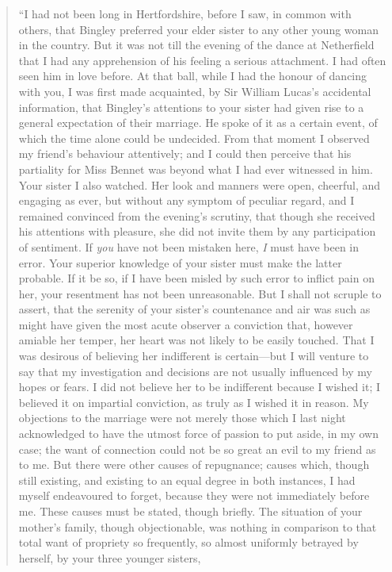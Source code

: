 \documentclass[12pt,english,oneside]{book}
\begin{document}
\begin{quotation}
{}``I had not been long in Hertfordshire, before I saw, in common
with others, that Bingley preferred your elder sister to any other
young woman in the country. But it was not till the evening of the
dance at Netherfield that I had any apprehension of his feeling a
serious attachment. I had often seen him in love before. At that ball,
while I had the honour of dancing with you, I was first made acquainted,
by Sir William Lucas's accidental information, that Bingley's attentions
to your sister had given rise to a general expectation of their marriage.
He spoke of it as a certain event, of which the time alone could be
undecided. From that moment I observed my friend's behaviour attentively;
and I could then perceive that his partiality for Miss Bennet was
beyond what I had ever witnessed in him. Your sister I also watched.
Her look and manners were open, cheerful, and engaging as ever, but
without any symptom of peculiar regard, and I remained convinced from
the evening's scrutiny, that though she received his attentions with
pleasure, she did not invite them by any participation of sentiment.
If \textit{you} have not been mistaken here, \textit{I} must have
been in error. Your superior knowledge of your sister must make the
latter probable. If it be so, if I have been misled by such error
to inflict pain on her, your resentment has not been unreasonable.
But I shall not scruple to assert, that the serenity of your sister's
countenance and air was such as might have given the most acute observer
a conviction that, however amiable her temper, her heart was not likely
to be easily touched. That I was desirous of believing her indifferent
is certain\mbox{---}but I will venture to say that my investigation
and decisions are not usually influenced by my hopes or fears. I did
not believe her to be indifferent because I wished it; I believed
it on impartial conviction, as truly as I wished it in reason. My
objections to the marriage were not merely those which I last night
acknowledged to have the utmost force of passion to put aside, in
my own case; the want of connection could not be so great an evil
to my friend as to me. But there were other causes of repugnance;
causes which, though still existing, and existing to an equal degree
in both instances, I had myself endeavoured to forget, because they
were not immediately before me. These causes must be stated, though
briefly. The situation of your mother's family, though objectionable,
was nothing in comparison to that total want of propriety so frequently,
so almost uniformly betrayed by herself, by your three younger sisters,

\end{quotation}
\end{document}
